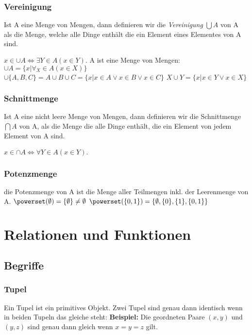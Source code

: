 \documentclass[a4paper,DIV10,12pt,headsepline,smallheadings,halfparskip-]{scrreprt}
\begin{document}
	\subsection{Vereinigung}
	Ist A eine Menge von Mengen, dann definieren wir die \emph{Vereinigung} \( \bigcup A\) von A als die Menge, welche alle Dinge enthält die ein Element eines Elementes von A sind.
	\par \hspace*{10mm} \( x \in \cup A \Leftrightarrow \exists Y \in A(x \in Y) \).
	\newline A ist eine Menge von Mengen: \newline
	\hspace*{10mm}\( \cup A = \{x | \forall_X \in A (x \in X)\}\) \newline
	\hspace*{10mm}\( \cup \{A, B, C\} = A \cup B \cup C = \{x|x \in A \vee x \in B \vee x \in C\}\) \newline
	\hspace*{10mm}\( X \cup Y = \{ x | x \in Y \vee x \in X \}\)
	\subsection{Schnittmenge}
	Ist A eine nicht leere Menge von Mengen, dann definieren wir die Schnittmenge \(\bigcap A\) von A, als die Menge die alle Dinge enthält, die ein Element von jedem Element von A sind.
	\par \hspace*{10mm} \( x \in \cap A \Leftrightarrow \forall Y \in A(x \in Y) \).
	\subsection{Potenzmenge}
	die Potenzmenge von A ist die Menge aller Teilmengen inkl. der Leerenmenge von A. \newline
	\( \powerset(\emptyset) = \{\emptyset\} \neq \emptyset \) \newline
	\( \powerset(\{0, 1\}) = \{\emptyset, \{0\}, \{1\}, \{0,1\}\} \)

	\chapter{Relationen und Funktionen}
	\section{Begriffe}
	\subsection{Tupel}
	Ein Tupel ist ein primitives Objekt. Zwei Tupel sind genau dann identisch wenn in beiden Tupeln das gleiche steht:
	\textbf{Beispiel:} Die geordneten Paare \( (x,y) \) und \( (y,z) \) sind genau dann gleich wenn \( x = y = z \)	gilt.
\end{document}
